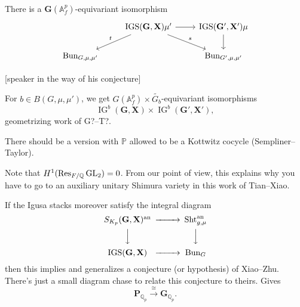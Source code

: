 \documentclass[reqno]{amsart} 
\begin{document}
\begin{conjecture}[Sempliner + E]\label{conjecture:cnpp17dreg}
  There is a $\mathbf{G}(\mathbb{A}_f^p)$-equivariant isomorphism
  \begin{equation*}
    \begin{tikzcd}
      & \operatorname{IGS}(\mathbf{G}, \mathbf{X}) \mu ' \arrow[ld, "t"'] \arrow[rd, "s"] \arrow[r] 
      & \operatorname{IGS}(\mathbf{G} ', \mathbf{X} '){\mu} \arrow[d] 
      \\
      \mathrm{Bun}_{G, \mu, \mu '} & & \mathrm{Bun}_{G', \mu, \mu '}
    \end{tikzcd}
  \end{equation*}

\end{conjecture}

[speaker in the way of his conjecture]

\begin{remark}
  For $b \in B(G, \mu, \mu ')$, we get $G(\mathbb{A}_f^p) \times \tilde{G_b}$-equivariant isomorphisms
  \begin{equation*}
    \operatorname{IG}^b(\mathbf{G}, \mathbf{X}) \times \operatorname{IG}^b(\mathbf{G} ', \mathbf{X} '),
  \end{equation*}
  geometrizing work of G?--T?.
\end{remark}

\begin{remark}
  There should be a version with $\mathbb{P}$ allowed to be a Kottwitz cocycle (Sempliner--Taylor).
\end{remark}

\begin{remark}
  Note that $H^1(\operatorname{Res}_{F / \mathbb{Q}} \operatorname{GL}_2) = 0$.  From our point of view, this explains why you have to go to an auxiliary unitary Shimura variety in this work of Tian--Xiao.
\end{remark}

\begin{remark}
  If the Igusa stacks moreover satisfy the integral diagram
  \begin{equation*}
    \begin{CD}         
      S_{K_p}(\mathbf{G}, \mathbf{X})^{\mathrm{an}} @>>> \operatorname{Sht}_{g, \mu}^{\mathrm{an}}\\
      @VVV  @VVV \\
      \operatorname{IGS}(\mathbf{G}, \mathbf{X}) @>>> \mathrm{Bun}_G\\
    \end{CD}
  \end{equation*}
  then this implies and generalizes a conjecture (or hypothesis) of Xiao--Zhu.  There's just a small diagram chase to relate this conjecture to theirs.  Gives
  \begin{equation}\label{eq:cnpp17s7i9}
    \mathbf{P}_{\mathbb{Q}_p} \xrightarrow{\cong} \mathbf{G}_{\mathbb{Q}_p}.
  \end{equation}
\end{remark}
\end{document}
